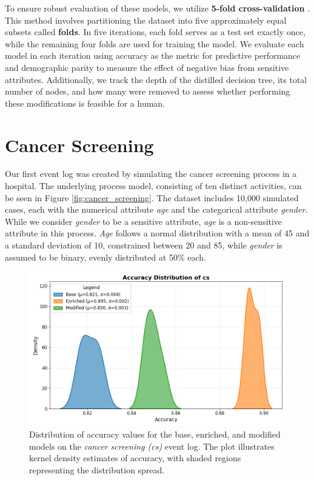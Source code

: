 To ensure robust evaluation of these models, we utilize \textbf{5-fold cross-validation} \cite{k_fold}.
This method involves partitioning the dataset into five approximately equal subsets called \textbf{folds}.
In five iterations, each fold serves as a test set exactly once, while the remaining four folds are used for training the model.
We evaluate each model in each iteration using accuracy as the metric for predictive performance
and demographic parity to measure the effect of negative bias from sensitive attributes.
Additionally, we track the depth of the distilled decision tree, its total number of nodes,
and how many were removed to assess whether performing these modifications is feasible for a human.

\section{Cancer Screening}
\label{sec:cancer_screening}
Our first event log was created by simulating the cancer screening process in a hospital.
The underlying process model, consisting of ten distinct activities, can be seen in Figure \ref{fig:cancer_screening}.
The dataset includes 10,000 simulated cases, each with the numerical attribute \textit{age}
and the categorical attribute \textit{gender}.
While we consider \textit{gender} to be a sensitive attribute,
\textit{age} is a non-sensitive attribute in this process.
\textit{Age} follows a normal distribution with a mean of 45 and a standard deviation of 10,
constrained between 20 and 85, while \textit{gender} is assumed to be binary, evenly distributed at 50\% each.  

\begin{figure}[h!]
    \centering
    \includegraphics[width=\imagewidth]{gfx/cs_accuracy.png}
    \caption{Distribution of accuracy values for the base, enriched, and modified models on the \textit{cancer screening (cs)} event log.
    The plot illustrates kernel density estimates of accuracy, with shaded regions representing the distribution spread.}
    \label{fig:cs_accuracy}
\end{figure}

